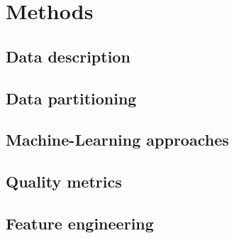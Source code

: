 \chapter{Methods}
\label{cha:Methods}


\section{Data description}



\section{Data partitioning}


\section{Machine-Learning approaches}


\section{Quality metrics}


% 

\section{Feature engineering}
